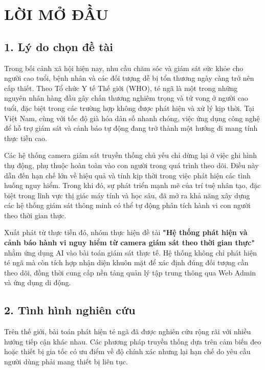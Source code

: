 \chapter*{LỜI MỞ ĐẦU}

\section*{1. Lý do chọn đề tài}

Trong bối cảnh xã hội hiện nay, nhu cầu chăm sóc và giám sát sức khỏe cho người cao tuổi, bệnh nhân và các đối tượng dễ bị tổn thương ngày càng trở nên cấp thiết. Theo Tổ chức Y tế Thế giới (WHO), té ngã là một trong những nguyên nhân hàng đầu gây chấn thương nghiêm trọng và tử vong ở người cao tuổi, đặc biệt trong các trường hợp không được phát hiện và xử lý kịp thời. Tại Việt Nam, cùng với tốc độ già hóa dân số nhanh chóng, việc ứng dụng công nghệ để hỗ trợ giám sát và cảnh báo tự động đang trở thành một hướng đi mang tính thực tiễn cao.

Các hệ thống camera giám sát truyền thống chủ yếu chỉ dừng lại ở việc ghi hình thụ động, phụ thuộc hoàn toàn vào con người trong quá trình theo dõi. Điều này dẫn đến hạn chế lớn về hiệu quả và tính kịp thời trong việc phát hiện các tình huống nguy hiểm. Trong khi đó, sự phát triển mạnh mẽ của trí tuệ nhân tạo, đặc biệt trong lĩnh vực thị giác máy tính và học sâu, đã mở ra khả năng xây dựng các hệ thống giám sát thông minh có thể tự động phân tích hành vi con người theo thời gian thực.

Xuất phát từ thực tiễn đó, nhóm thực hiện đề tài \textbf{"Hệ thống phát hiện và cảnh báo hành vi nguy hiểm từ camera giám sát theo thời gian thực"} nhằm ứng dụng AI vào bài toán giám sát thực tế. Hệ thống không chỉ phát hiện té ngã mà còn tích hợp nhận diện khuôn mặt để xác định đúng đối tượng cần theo dõi, đồng thời cung cấp nền tảng quản lý tập trung thông qua Web Admin và ứng dụng di động.

\section*{2. Tình hình nghiên cứu}

Trên thế giới, bài toán phát hiện té ngã đã được nghiên cứu rộng rãi với nhiều hướng tiếp cận khác nhau. Các phương pháp truyền thống dựa trên cảm biến đeo hoặc thiết bị gia tốc có ưu điểm về độ chính xác nhưng lại hạn chế do yêu cầu người dùng phải mang thiết bị liên tục.

